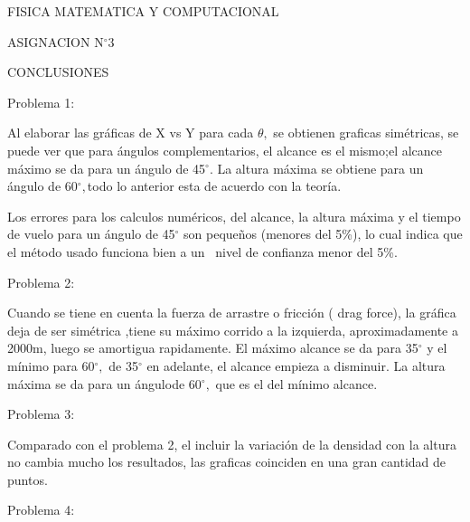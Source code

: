 \documentclass{article}
\begin{document}
\begin{center}
FISICA MATEMATICA Y COMPUTACIONAL\bigskip

ASIGNACION N$%
{{}^\circ}%
3$

\newline CONCLUSIONES
\end{center}

\newline Problema 1:

Al elaborar las gr\'{a}ficas de X vs Y para cada $\theta,$ se obtienen
graficas sim\'{e}tricas,  se puede ver que para \'{a}ngulos complementarios,
el alcance es el mismo;el alcance m\'{a}ximo se da para un \'{a}ngulo de 45$%
{{}^\circ}%
.$ La altura m\'{a}xima se obtiene para un \'{a}ngulo de 60$%
{{}^\circ}%
,$todo lo anterior esta de acuerdo con la teor\'{i}a.

Los errores para los calculos num\'{e}ricos, del alcance, la altura m\'{a}xima
y el tiempo de vuelo para un \'{a}ngulo de 45$%
{{}^\circ}%
$ son peque\~{n}os (menores del 5\%), lo cual indica que el m\'{e}todo usado
funciona bien a un \ nivel de confianza menor del 5\%.

Problema 2:

Cuando se tiene en cuenta la fuerza de arrastre o fricci\'{o}n ( drag force),
la gr\'{a}fica deja de ser sim\'{e}trica ,tiene su m\'{a}ximo corrido a la
izquierda, aproximadamente a 2000m, luego se amortigua rapidamente. El
m\'{a}ximo alcance se da para 35$%
{{}^\circ}%
$ y el m\'{i}nimo para 60$%
{{}^\circ}%
,$ de 35$%
{{}^\circ}%
$ en adelante, el alcance empieza a disminuir. La altura m\'{a}xima se da para
un \'{a}ngulode 60$%
{{}^\circ}%
,$ que es el del m\'{i}nimo alcance.

\newline Problema 3:

Comparado con el problema 2, el incluir la variaci\'{o}n de la densidad con la
altura no cambia mucho los resultados, las graficas coinciden en una gran
cantidad de puntos.

\newline Problema 4:
\end{document}
